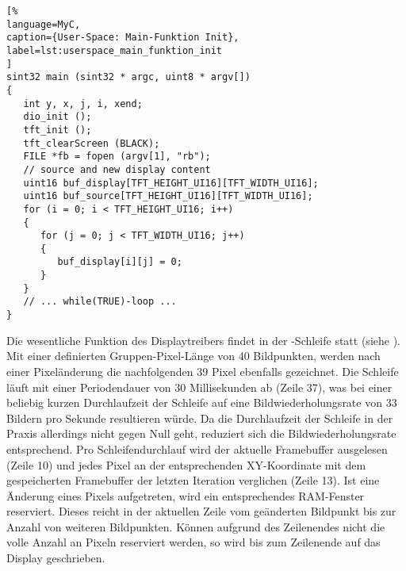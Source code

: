 \begin{lstlisting}[%
language=MyC,
caption={User-Space: Main-Funktion Init},
label=lst:userspace_main_funktion_init
]
sint32 main (sint32 * argc, uint8 * argv[])
{
   int y, x, j, i, xend;
   dio_init ();
   tft_init ();
   tft_clearScreen (BLACK);	   
   FILE *fb = fopen (argv[1], "rb");
   // source and new display content
   uint16 buf_display[TFT_HEIGHT_UI16][TFT_WIDTH_UI16];
   uint16 buf_source[TFT_HEIGHT_UI16][TFT_WIDTH_UI16];
   for (i = 0; i < TFT_HEIGHT_UI16; i++)
   {
      for (j = 0; j < TFT_WIDTH_UI16; j++)
      {
         buf_display[i][j] = 0;
      }
   }
   // ... while(TRUE)-loop ...
}
\end{lstlisting}
Die wesentliche Funktion des Displaytreibers findet in der -Schleife statt (siehe ). Mit einer definierten Gruppen-Pixel-Länge  von 40 Bildpunkten, werden nach einer Pixeländerung die nachfolgenden 39 Pixel ebenfalls gezeichnet. Die Schleife läuft mit einer Periodendauer von 30 Millisekunden ab (Zeile 37), was bei einer  beliebig kurzen Durchlaufzeit der Schleife auf eine Bildwiederholungsrate von 33 Bildern pro Sekunde resultieren würde. Da die Durchlaufzeit der Schleife in der Praxis allerdings nicht gegen Null geht, reduziert sich die Bildwiederholungsrate entsprechend. Pro Schleifendurchlauf wird der aktuelle Framebuffer ausgelesen (Zeile 10) und jedes Pixel an der entsprechenden XY-Koordinate mit dem gespeicherten Framebuffer der letzten Iteration verglichen (Zeile 13). Ist eine Änderung eines Pixels aufgetreten, wird ein entsprechendes RAM-Fenster reserviert. Dieses reicht in der aktuellen Zeile vom geänderten Bildpunkt bis zur Anzahl von  weiteren Bildpunkten. Können aufgrund des Zeilenendes nicht die volle Anzahl an Pixeln reserviert werden, so wird bis zum Zeilenende auf das Display geschrieben.

